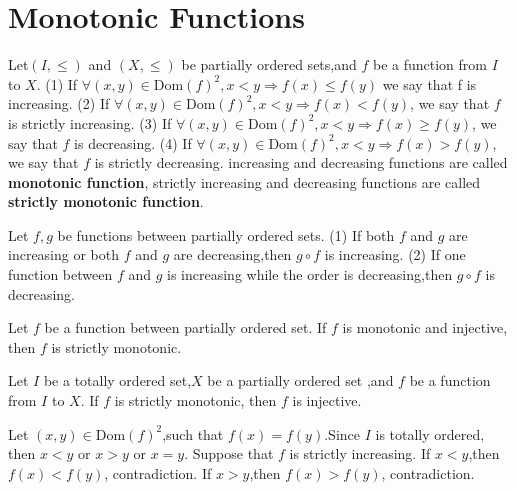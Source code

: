 \documentclass{book}
\numberwithin{equation}{section}
\begin{document}
\section{Monotonic Functions}
\begin{definitionenv}
    Let$(I,\le)$ and $(X,\le)$ be partially ordered sets,and $f$ be a function from $I$
 to $X$.
 \newline
 (1) If $\forall(x,y)\in \mathrm{Dom}(f)^2,x<y \Rightarrow f(x)\le f(y)$ we say that f is increasing.
 \newline
 (2) If $\forall (x,y)\in \mathrm{Dom}(f)^2,x<y \Rightarrow f(x)< f(y)$, we say that $f$ is strictly increasing.
 \newline
  (3) If $\forall (x,y)\in \mathrm{Dom}(f)^2,x<y \Rightarrow f(x)\geq  f(y)$, we say that $f$ is decreasing.
\newline
 (4) If $\forall (x,y)\in \mathrm{Dom}(f)^2,x<y \Rightarrow f(x)> f(y)$, we say that $f$ is strictly decreasing.
 \newline
increasing and decreasing functions are called \textbf{monotonic function}, strictly increasing and decreasing functions are called \textbf{strictly monotonic function}.
\end{definitionenv}
\begin{propositionenv}
    Let $f,g$ be functions between partially ordered sets.
    \newline
    (1) If both $f$ and $g$ are increasing or both $f$ and $g$ are decreasing,then $g\circ f $ is increasing.
    \newline
    (2) If one function between $f$ and $g$ is increasing while the order is decreasing,then $g\circ f $ is decreasing.
\end{propositionenv}
\begin{propositionenv}
    Let $f$ be a function between partially ordered set. If $f$ is monotonic and injective, then $f$ is strictly monotonic.
\end{propositionenv}
\begin{propositionenv}
    Let $I$ be a totally ordered set,$X$ be a partially ordered set ,and $f$ be a function from $I$ to $X$. If $f$ is strictly monotonic, then $f$ is injective.
\end{propositionenv}
\begin{proofenv}
    Let $(x,y)\in \mathrm{Dom}(f)^2$,such that $f(x)=f(y)$.Since $I$ is totally ordered, then $x<y$ or $x>y$ or $x=y$. Suppose that $f$ is strictly increasing. If $x<y $,then $f(x)<f(y)$, contradiction. If $x>y $,then $f(x)>f(y)$, contradiction.
\end{proofenv}
\end{document}
